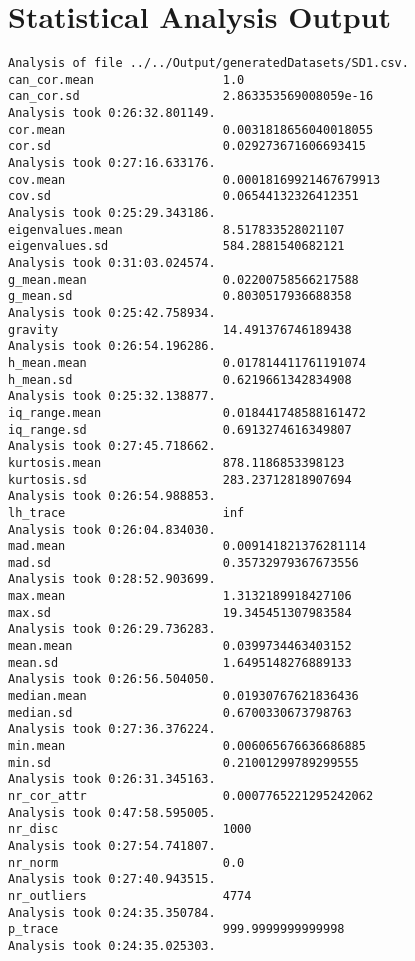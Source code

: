 \chapter{Statistical Analysis Output} \label{appendix:statistical}

\begin{lstlisting}[breaklines=true, basicstyle=\footnotesize, tabsize=1]
Analysis of file ../../Output/generatedDatasets/SD1.csv.
can_cor.mean                  1.0
can_cor.sd                    2.863353569008059e-16
Analysis took 0:26:32.801149.
cor.mean                      0.0031818656040018055
cor.sd                        0.029273671606693415
Analysis took 0:27:16.633176.
cov.mean                      0.00018169921467679913
cov.sd                        0.06544132326412351
Analysis took 0:25:29.343186.
eigenvalues.mean              8.517833528021107
eigenvalues.sd                584.2881540682121
Analysis took 0:31:03.024574.
g_mean.mean                   0.02200758566217588
g_mean.sd                     0.8030517936688358
Analysis took 0:25:42.758934.
gravity                       14.491376746189438
Analysis took 0:26:54.196286.
h_mean.mean                   0.017814411761191074
h_mean.sd                     0.6219661342834908
Analysis took 0:25:32.138877.
iq_range.mean                 0.018441748588161472
iq_range.sd                   0.6913274616349807
Analysis took 0:27:45.718662.
kurtosis.mean                 878.1186853398123
kurtosis.sd                   283.23712818907694
Analysis took 0:26:54.988853.
lh_trace                      inf
Analysis took 0:26:04.834030.
mad.mean                      0.009141821376281114
mad.sd                        0.35732979367673556
Analysis took 0:28:52.903699.
max.mean                      1.3132189918427106
max.sd                        19.345451307983584
Analysis took 0:26:29.736283.
mean.mean                     0.0399734463403152
mean.sd                       1.6495148276889133
Analysis took 0:26:56.504050.
median.mean                   0.01930767621836436
median.sd                     0.6700330673798763
Analysis took 0:27:36.376224.
min.mean                      0.006065676636686885
min.sd                        0.21001299789299555
Analysis took 0:26:31.345163.
nr_cor_attr                   0.0007765221295242062
Analysis took 0:47:58.595005.
nr_disc                       1000
Analysis took 0:27:54.741807.
nr_norm                       0.0
Analysis took 0:27:40.943515.
nr_outliers                   4774
Analysis took 0:24:35.350784.
p_trace                       999.9999999999998
Analysis took 0:24:35.025303.

\end{lstlisting}
